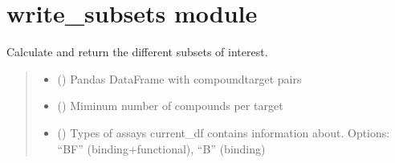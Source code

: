 \documentclass[letterpaper,10pt,english]{sphinxmanual}
\begin{document}
\sphinxstepscope


\section{write\_subsets module}
\label{\detokenize{write_subsets:module-write_subsets}}\label{\detokenize{write_subsets:write-subsets-module}}\label{\detokenize{write_subsets::doc}}

\begin{fulllineitems}
\label{\detokenize{write_subsets:write_subsets.get_data_subsets}}
\pysigstartsignatures
{}
\pysigstopsignatures
\sphinxAtStartPar
Calculate and return the different subsets of interest.
\begin{quote}\begin{description}
\begin{itemize}
\item {} 
\sphinxAtStartPar
{} () \textendash{} Pandas DataFrame with compound\sphinxhyphen{}target pairs

\item {} 
\sphinxAtStartPar
{} () \textendash{} Miminum number of compounds per target

\item {} 
\sphinxAtStartPar
{} () \textendash{} Types of assays current\_df contains information about.         Options: “BF” (binding+functional), “B” (binding)


\end{itemize}
\end{description}
\end{quote}
\end{fulllineitems}
\end{document}
